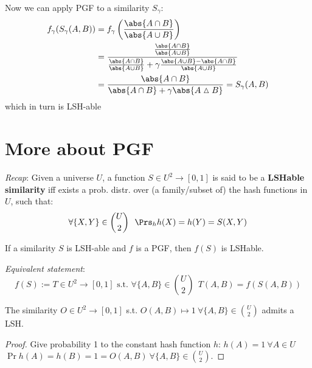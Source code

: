 Now we can apply PGF to a similarity $S_\gamma$:
\begin{align*}
f_\gamma (S_\gamma(A, B))
&= f_\gamma \left( \frac{\abs{A \cap B}}{\abs{A \cup B}} \right) \\
&= \frac{\frac{\abs{A \cap B}}{\abs{A \cup B}}}
	{\frac{\abs{A \cap B}}{\abs{A \cup B}} +
		\gamma \frac{\abs{A \cup B} -
			\abs{A \cap B}}{\abs{A \cup B}}} \\
&= \frac{\abs{A \cap B}}
	{\abs{A \cap B} + \gamma \abs{A \vartriangle B}}
	= S_\gamma(A, B)
\end{align*}
which in turn is LSH-able
	
\section{More about PGF}  %
	
\textit{Recap}: Given a universe $U$, a function $S \in U^2 \to [0, 1]$ is said to be a \textbf{LSHable similarity} iff exists a prob. distr. over (a family/subset of) the hash functions in $U$, such that: 
\begin{equation}
\forall \{X, Y\} \in \binom{U}{2}\ \ \Prs_h{h(X)=h(Y)} = S(X, Y)
\end{equation}

\thm \label{t:pgf_1} If a similarity $S$ is LSH-able and $f$ is a PGF, then $f(S)$ is LSHable.

\textit{Equivalent statement}:
\begin{equation}
f(S) := T \in U^2 \to [0, 1] \text{ s.t. } \forall \{A, B\} \in \binom{U}{2}\ \ T(A, B) = f(S(A, B))
\end{equation}


\lem[L1] \label{l:pgf_1} The similarity $O \in U^2 \to [0, 1]$ s.t. $O(A, B) \mapsto 1 \ \forall \{A, B\} \in \binom{U}{2}$ admits a LSH.

\begin{proof}
	Give probability 1 to the constant hash function $h$: $h(A)=1 \ \forall A\in U$\\
	$\Pr{h(A)=h(B)}=1=O(A,B) \ \forall \{A, B\} \in \binom{U}{2}$.
	
\end{proof}

